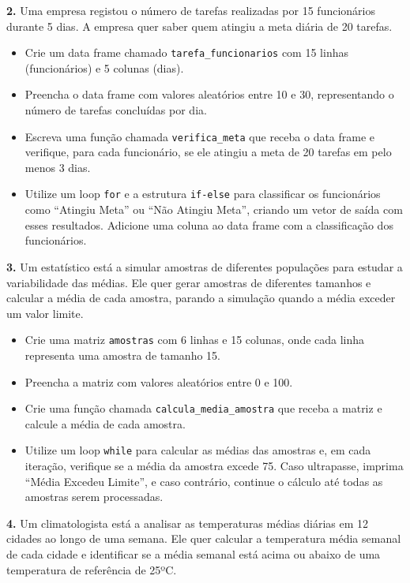\documentclass[
]{book}
\providecommand{\tightlist}{%
  \setlength{\itemsep}{0pt}\setlength{\parskip}{0pt}}
\begin{document}
\textbf{2.} Uma empresa registou o número de tarefas realizadas por 15 funcionários durante 5 dias. A empresa quer saber quem atingiu a meta diária de 20 tarefas.

\begin{itemize}
\tightlist
\item
  Crie um data frame chamado \texttt{tarefa\_funcionarios} com 15 linhas (funcionários) e 5 colunas (dias).
\item
  Preencha o data frame com valores aleatórios entre 10 e 30, representando o número de tarefas concluídas por dia.
\item
  Escreva uma função chamada \texttt{verifica\_meta} que receba o data frame e verifique, para cada funcionário, se ele atingiu a meta de 20 tarefas em pelo menos 3 dias.
\item
  Utilize um loop \texttt{for} e a estrutura \texttt{if-else} para classificar os funcionários como ``Atingiu Meta'' ou ``Não Atingiu Meta'', criando um vetor de saída com esses resultados. Adicione uma coluna ao data frame com a classificação dos funcionários.
\end{itemize}

\textbf{3.} Um estatístico está a simular amostras de diferentes populações para estudar a variabilidade das médias. Ele quer gerar amostras de diferentes tamanhos e calcular a média de cada amostra, parando a simulação quando a média exceder um valor limite.

\begin{itemize}
\tightlist
\item
  Crie uma matriz \texttt{amostras} com 6 linhas e 15 colunas, onde cada linha representa uma amostra de tamanho 15.
\item
  Preencha a matriz com valores aleatórios entre 0 e 100.
\item
  Crie uma função chamada \texttt{calcula\_media\_amostra} que receba a matriz e calcule a média de cada amostra.
\item
  Utilize um loop \texttt{while} para calcular as médias das amostras e, em cada iteração, verifique se a média da amostra excede 75. Caso ultrapasse, imprima ``Média Excedeu Limite'', e caso contrário, continue o cálculo até todas as amostras serem processadas.
\end{itemize}

\textbf{4.} Um climatologista está a analisar as temperaturas médias diárias em 12 cidades ao longo de uma semana. Ele quer calcular a temperatura média semanal de cada cidade e identificar se a média semanal está acima ou abaixo de uma temperatura de referência de 25ºC.
\end{document}
